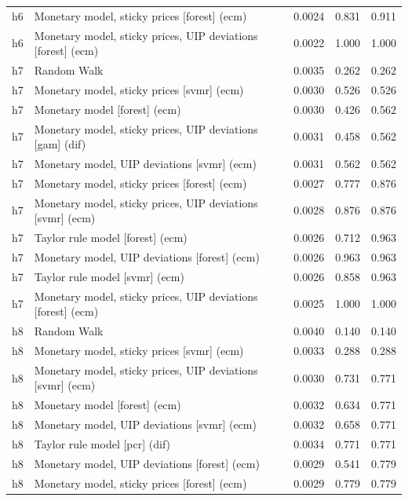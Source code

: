 \begin{ThreePartTable}
\begin{longtable}[t]{cp{5.5cm}ccc}
h6 & \raggedright Monetary model, sticky prices [forest] (ecm) & 0.0024 & 0.831 & 0.911\\
h6 & \raggedright Monetary model, sticky prices, UIP deviations [forest] (ecm) & 0.0022 & 1.000 & 1.000\\
\addlinespace
h7 & \raggedright Random Walk & 0.0035 & 0.262 & 0.262\\
h7 & \raggedright Monetary model, sticky prices [svmr] (ecm) & 0.0030 & 0.526 & 0.526\\
h7 & \raggedright Monetary model [forest] (ecm) & 0.0030 & 0.426 & 0.562\\
h7 & \raggedright Monetary model, sticky prices, UIP deviations [gam] (dif) & 0.0031 & 0.458 & 0.562\\
h7 & \raggedright Monetary model, UIP deviations [svmr] (ecm) & 0.0031 & 0.562 & 0.562\\
h7 & \raggedright Monetary model, sticky prices [forest] (ecm) & 0.0027 & 0.777 & 0.876\\
h7 & \raggedright Monetary model, sticky prices, UIP deviations [svmr] (ecm) & 0.0028 & 0.876 & 0.876\\
h7 & \raggedright Taylor rule model [forest] (ecm) & 0.0026 & 0.712 & 0.963\\
h7 & \raggedright Monetary model, UIP deviations [forest] (ecm) & 0.0026 & 0.963 & 0.963\\
h7 & \raggedright Taylor rule model [svmr] (ecm) & 0.0026 & 0.858 & 0.963\\
h7 & \raggedright Monetary model, sticky prices, UIP deviations [forest] (ecm) & 0.0025 & 1.000 & 1.000\\
\addlinespace
h8 & \raggedright Random Walk & 0.0040 & 0.140 & 0.140\\
h8 & \raggedright Monetary model, sticky prices [svmr] (ecm) & 0.0033 & 0.288 & 0.288\\
h8 & \raggedright Monetary model, sticky prices, UIP deviations [svmr] (ecm) & 0.0030 & 0.731 & 0.771\\
h8 & \raggedright Monetary model [forest] (ecm) & 0.0032 & 0.634 & 0.771\\
h8 & \raggedright Monetary model, UIP deviations [svmr] (ecm) & 0.0032 & 0.658 & 0.771\\
h8 & \raggedright Taylor rule model [pcr] (dif) & 0.0034 & 0.771 & 0.771\\
h8 & \raggedright Monetary model, UIP deviations [forest] (ecm) & 0.0029 & 0.541 & 0.779\\
h8 & \raggedright Monetary model, sticky prices [forest] (ecm) & 0.0029 & 0.779 & 0.779\\

\end{longtable}
\end{ThreePartTable}
